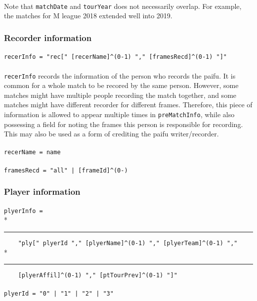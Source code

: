 \documentclass[%
	a4paper%
	,10pt%
	,twoside%
	,notitlepage%
]{article}%
\newcommand*{\ruleSymbol}{\textjapanese{⚠}}%
\newcommand*{\ruleMargin}{\marginpar{\flushright{}\ruleSymbol{}}}%
\newcommand*{\rulePar}{\paragraph*{\ruleMargin{}}}%
\newcommand*{\indentRule}{\rule{10pt}{0pt}}%
\begin{document}
			\paragraph*{}Note that \lstinline/matchDate/ and \lstinline/tourYear/ does not necessarily overlap. For example, the matches for M league 2018 extended well into 2019. %
		\subsubsection{Recorder information}%
			\rulePar{}\lstinline/recerInfo = "rec[" [recerName]^(0-1) "," [framesRecd]^(0-1) "]"/%
			\paragraph*{}\lstinline/recerInfo/ records the information of the person who records the paifu. It is common for a whole match to be recored by the same person. However, some matches might have multiple people recording the match together, and some matches might have different recorder for different frames. Therefore, this piece of information is allowed to appear multiple times in \lstinline/preMatchInfo/, while also possessing a field for noting the frames this person is responsible for recording. This may also be used as a form of crediting the paifu writer/recorder. %
			\rulePar{}\lstinline/recerName = name/%
			\rulePar{}\lstinline/framesRecd = "all" | [frameId]^(0-)/%
		\subsubsection{Player information}%
			\rulePar{}\lstinline/plyerInfo = /\\*{}%
			\indentRule{}\lstinline/    "ply[" plyerId "," [plyerName]^(0-1) "," [plyerTeam]^(0-1) "," /\\*{}%
			\indentRule{}\lstinline/    [plyerAffil]^(0-1) "," [ptTourPrev]^(0-1) "]"/%
			\rulePar{}\lstinline/plyerId = "0" | "1" | "2" | "3"/%
\end{document}
